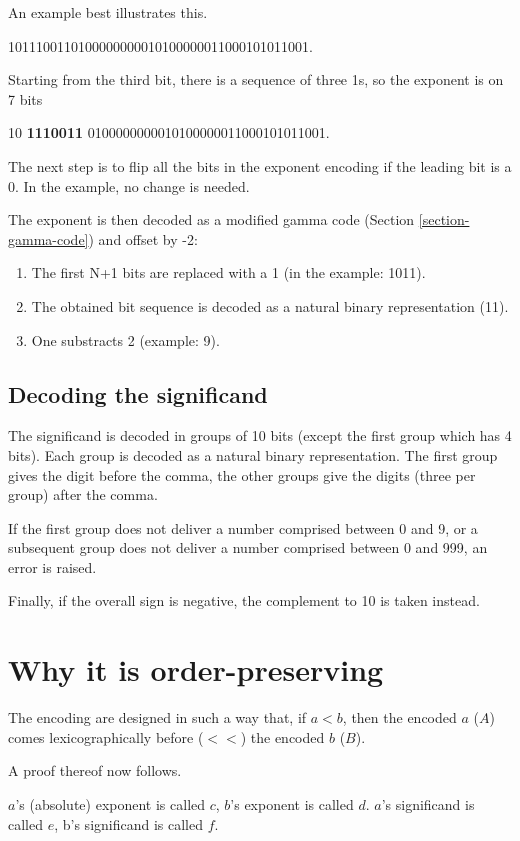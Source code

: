 \documentclass{acm_proc_article-sp}
\begin{document}
An example best illustrates this.

1011100110100000000010100000011000101011001.

Starting from the third bit, there is a sequence of three 1s, so the exponent is on 7 bits

10 \textbf{1110011} 0100000000010100000011000101011001.

The next step is to flip all the bits in the exponent encoding if the leading bit is a 0. In the example, no change is needed.

The exponent is then decoded as a modified gamma code (Section \ref{section-gamma-code}) and offset by -2:

\begin{enumerate}
\item The first N+1 bits are replaced with a 1 (in the example: 1011).
\item The obtained bit sequence is decoded as a natural binary representation (11).
\item One substracts 2 (example: 9).
\end{enumerate}

\subsection{Decoding the significand}

The significand is decoded in groups of 10 bits (except the first group which has 4 bits). Each group is decoded as a natural binary representation. The first group gives the digit before the comma, the other groups give the digits (three per group) after the comma.

If the first group does not deliver a number comprised between 0 and 9, or a subsequent group does not deliver a number comprised between 0 and 999, an error is raised.

Finally, if the overall sign is negative, the complement to 10 is taken instead.

\section{Why it is order-preserving}
\label{section-proof}

The encoding are designed in such a way that, if $a < b$, then the encoded $a$ ($A$) comes lexicographically before ($<<$) the encoded $b$ ($B$).

A proof thereof now follows.

$a$'s (absolute) exponent is called $c$, $b$'s exponent is called $d$. $a$'s significand is called $e$, b's significand is called $f$.
 
\end{document}
